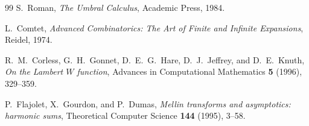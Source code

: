 \documentclass[11pt]{article}
\numberwithin{equation}{section}
\theoremstyle{definition}
\theoremstyle{remark}
\begin{document}
\begin{thebibliography}{99}
S.~Roman,
\emph{The Umbral Calculus},
Academic Press, 1984.

L.~Comtet,
\emph{Advanced Combinatorics: The Art of Finite and Infinite Expansions},
Reidel, 1974.

R.~M.~Corless, G.~H.~Gonnet, D.~E.~G.~Hare, D.~J.~Jeffrey, and D.~E.~Knuth,
\emph{On the Lambert $W$ function},
Advances in Computational Mathematics \textbf{5} (1996), 329--359.

P.~Flajolet, X.~Gourdon, and P.~Dumas,
\emph{Mellin transforms and asymptotics: harmonic sums},
Theoretical Computer Science \textbf{144} (1995), 3--58.

\end{thebibliography}
\end{document}
